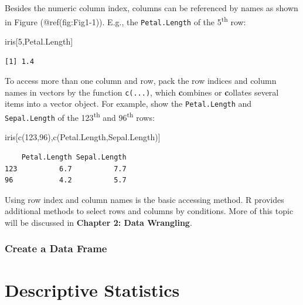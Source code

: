 \documentclass[
  letterpaper,
]{book}
\newenvironment{Shaded}{\begin{snugshade}}{\end{snugshade}}
\newcommand{\DecValTok}[1]{\textcolor[rgb]{0.68,0.00,0.00}{#1}}
\newcommand{\FunctionTok}[1]{\textcolor[rgb]{0.28,0.35,0.67}{#1}}
\newcommand{\NormalTok}[1]{\textcolor[rgb]{0.00,0.23,0.31}{#1}}
\newcommand{\StringTok}[1]{\textcolor[rgb]{0.13,0.47,0.30}{#1}}
\begin{document}
Besides the numeric column index, columns can be referenced by names as
shown in Figure (@ref(fig:Fig1-1)). E.g., the \texttt{Petal.Length} of
the 5\textsuperscript{th} row:

\begin{Shaded}
\begin{Highlighting}[]
\NormalTok{iris[}\DecValTok{5}\NormalTok{,}\StringTok{\textquotesingle{}Petal.Length\textquotesingle{}}\NormalTok{]}
\end{Highlighting}
\end{Shaded}

\begin{verbatim}
[1] 1.4
\end{verbatim}

To access more than one column and row, pack the row indices and column
names in vectors by the function \texttt{c(...)}, which
\textbf{c}ombines or \textbf{c}ollates several items into a vector
object. For example, show the \texttt{Petal.Length} and
\texttt{Sepal.Length} of the 123\textsuperscript{th} and
96\textsuperscript{th} rows:

\begin{Shaded}
\begin{Highlighting}[]
\NormalTok{iris[}\FunctionTok{c}\NormalTok{(}\DecValTok{123}\NormalTok{,}\DecValTok{96}\NormalTok{),}\FunctionTok{c}\NormalTok{(}\StringTok{\textquotesingle{}Petal.Length\textquotesingle{}}\NormalTok{,}\StringTok{\textquotesingle{}Sepal.Length\textquotesingle{}}\NormalTok{)]}
\end{Highlighting}
\end{Shaded}

\begin{verbatim}
    Petal.Length Sepal.Length
123          6.7          7.7
96           4.2          5.7
\end{verbatim}

Using row index and column names is the basic accessing method. R
provides additional methods to select rows and columns by conditions.
More of this topic will be discussed in \textbf{Chapter 2: Data
Wrangling}.

\subsubsection*{Create a Data Frame}\label{create-a-data-frame}

\section*{Descriptive Statistics}\label{descriptive-statistics}
\end{document}
